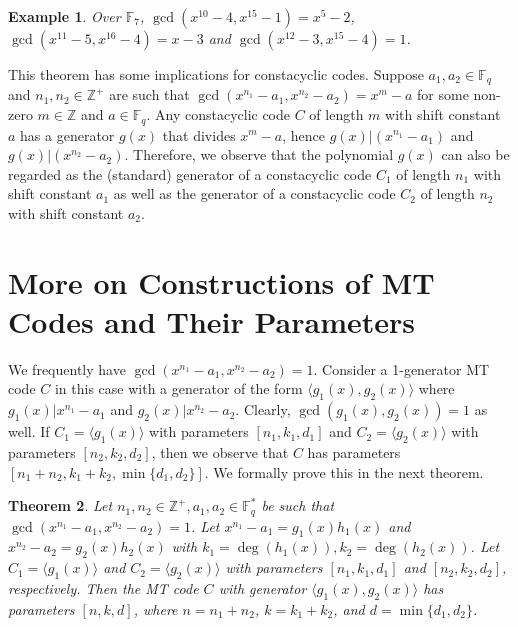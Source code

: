 \documentclass[preprint,12pt]{elsarticle}
\newtheorem{Theorem}{Theorem}[section]
\newtheorem{Example}[Theorem]{Example}
\newcommand{\Fq}{\mathbb{F}_q}
\begin{document}
\begin{Example}
 Over $\mathbb{F}_7$, $\gcd(x^{10} -4, x^{15} -1)=x^5-2$,   $\gcd(x^{11}-5,x^{16}-4)= x-3$ and $\gcd(x^{12}-3,x^{15}-4)=1$.
\end{Example}

This theorem has some implications for constacyclic codes. Suppose $a_1,a_2\in \Fq$ and $n_1,n_2\in \mathbb{Z}^{+}$ are such that 
$\gcd(x^{n_1}-a_1,x^{n_2}-a_2)=x^m-a$ for some non-zero $m \in \mathbb{Z}$ and $a\in \Fq$. Any constacyclic code $C$ of length $m$ with shift constant $a$ has a generator $g(x)$ that divides $x^m-a$, hence $g(x)|(x^{n_1}-a_1)$ and $g(x)|(x^{n_2}-a_2)$. Therefore, we observe that the polynomial $g(x)$ can also be regarded as the (standard) generator of a constacyclic code $C_1$ of length $n_1$ with shift constant $a_1$  as well as the generator  of a constacyclic code $C_2$ of length $n_2$ with shift constant $a_2$. 


\section{More on Constructions of MT Codes and Their Parameters }

We frequently have $\gcd(x^{n_1}-a_1,x^{n_2}-a_2)=1$. Consider a 1-generator MT code $C$ in this case with a generator of the form $\langle g_1(x), g_2(x)\rangle$ where $g_1(x)|x^{n_1}-a_1$ and $g_2(x)|x^{n_2}-a_2$. Clearly, $\gcd(g_1(x),g_2(x))=1$ as well. If $C_1=\langle g_1(x) \rangle$ with parameters $[n_1,k_1,d_1]$ and $C_2=\langle g_2(x) \rangle$ with parameters $[n_2,k_2,d_2]$, then 
we observe that $C$ has parameters $[n_1+n_2,k_1+k_2,\min\{d_1,d_2\}]$. We formally prove this in the next theorem. 
\begin{Theorem}\label{prop}
 Let $n_1,n_2\in \mathbb{Z}^{+}, a_1,a_2\in \Fq^*$ be such that $\gcd(x^{n_1}-a_1,x^{n_2}-a_2)=1$. 
Let $x^{n_1}-a_1=g_1(x)h_1(x)$ and $x^{n_2}-a_2=g_2(x)h_2(x)$ with $k_1=\deg(h_1(x)), k_2=\deg(h_2(x))$. Let $C_1=\langle g_1(x)\rangle$ and $C_2=\langle g_2(x)\rangle$ with parameters $[n_1,k_1,d_1]$ and $[n_2,k_2,d_2]$, respectively. Then the MT code $C$ with generator $\langle g_1(x), g_2(x)\rangle$ has parameters $[n,k,d]$, where $n=n_1+n_2$, $k=k_1+k_2$, and $d=\min\{d_1,d_2\}$.
\end{Theorem}
\end{document}
